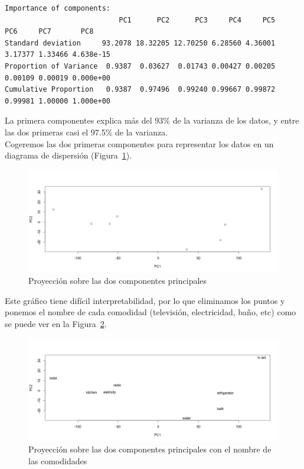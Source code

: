 \documentclass[12pt,a4paper,twoside,openright,titlepage,final]{article}
\begin{document}
\begin{Verbatim}[fontsize=\scriptsize]
Importance of components:
                           PC1      PC2      PC3     PC4     PC5     PC6     PC7       PC8
Standard deviation     93.2078 18.32205 12.70250 6.28560 4.36001 3.17377 1.33466 4.638e-15
Proportion of Variance  0.9387  0.03627  0.01743 0.00427 0.00205 0.00109 0.00019 0.000e+00
Cumulative Proportion   0.9387  0.97496  0.99240 0.99667 0.99872 0.99981 1.00000 1.000e+00
\end{Verbatim}

La primera componentes explica más del 93\% de la varianza de los datos, y entre las dos primeras casi el 97.5\% de la varianza.\\

Cogeremos las dos primeras componentes para representar los datos en un diagrama de dispersión (Figura~\ref{fig:dos_componentes}).\\

\begin{figure}[tbph!]
\centering
\includegraphics[width=0.8\linewidth]{imagenes/dos_componentes}
\caption{Proyección sobre las dos componentes principales}
\label{fig:dos_componentes}
\end{figure}

Este gráfico tiene difícil interpretabilidad, por lo que eliminamos los puntos y ponemos el nombre de cada comodidad (televisión, electricidad, baño, etc) como se puede ver en la Figura~\ref{fig:dos_componentes_nombres}.\\

\begin{figure}[tbph!]
\centering
\includegraphics[width=0.8\linewidth]{imagenes/dos_componentes_nombres}
\caption{Proyección sobre las dos componentes principales con el nombre de las comodidades}
\label{fig:dos_componentes_nombres}
\end{figure}
\end{document}
